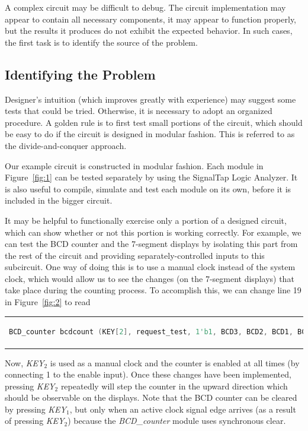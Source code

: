\documentclass[11pt, twoside, pdftex]{article}
\begin{document}
A complex circuit may be difficult to debug. The circuit implementation may appear 
to contain all necessary components, it may appear to function properly, but the 
results it produces do not exhibit the expected behavior. In such cases, the 
first task is to identify the source of the problem.

\subsection{Identifying the Problem}
Designer's intuition (which improves greatly with experience) may suggest some 
tests that could be tried. Otherwise, it is necessary to adopt an organized
procedure. A golden rule is to first test small portions of the circuit, which
should be easy to do if the circuit is designed in modular fashion. This is
referred to as the divide-and-conquer approach.

Our example circuit is constructed in modular fashion. Each module in Figure~\ref{fig:1}
can be tested separately by using the SignalTap Logic Analyzer. It is 
also useful to compile, simulate and test each module on its own, before it is 
included in the bigger circuit.

It may be helpful to functionally exercise only a portion of a designed circuit, 
which can show whether or not this portion is working correctly. For example,
we can test the BCD counter and the 7-segment displays by isolating this
part from the rest of the circuit and providing separately-controlled inputs
to this subcircuit. One way of doing this is to use a manual clock instead
of the system clock, which would allow us to see the changes (on the 7-segment
displays) that take place during the counting process. To accomplish this,
we can change line 19 in Figure~\ref{fig:2} to read
\begin{center}
\begin{tabular}{c}
\begin{lstlisting}[language=Verilog]
BCD_counter bcdcount (KEY[2], request_test, 1'b1, BCD3, BCD2, BCD1, BCD0);
\end{lstlisting}
\end{tabular}
\end{center}
\noindent
Now, {\it KEY}$_2$ is used as a manual clock and the counter is enabled at
all times (by connecting 1 to the enable input). Once these changes have been implemented, pressing {\it KEY}$_2$
repeatedly will step the counter in the upward direction which should be 
observable on the displays. Note that the BCD counter can be cleared by
pressing {\it KEY}$_1$, but only when an active clock signal edge arrives
(as a result of pressing {\it KEY}$_2$) because the {\it BCD\_counter} module
uses synchronous clear.
\end{document}

